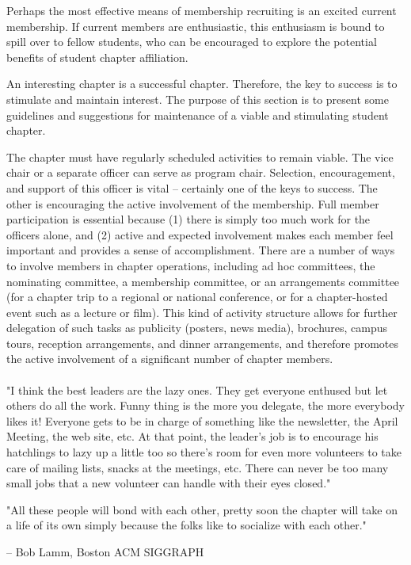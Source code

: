 Perhaps the most effective means of membership recruiting is an excited current
membership. If current members are enthusiastic, this enthusiasm is bound to
spill over to fellow students, who can be encouraged to explore the potential
benefits of student chapter affiliation.

An interesting chapter is a successful chapter. Therefore, the key to success is
to stimulate and maintain interest. The purpose of this section is to present
some guidelines and suggestions for maintenance of a viable and stimulating
student chapter.

The chapter must have regularly scheduled activities to remain viable. The vice
chair or a separate officer can serve as program chair. Selection, encouragement,
and support of this officer is vital -- certainly one of the keys to success.
The other is encouraging the active involvement of the membership. Full member
participation is essential because (1) there is simply too much work for the
officers alone, and (2) active and expected involvement makes each member feel
important and provides a sense of accomplishment. There are a number of ways to
involve members in chapter operations, including ad hoc committees, the
nominating committee, a membership committee, or an arrangements committee (for
a chapter trip to a regional or national conference, or for a chapter-hosted
event such as a lecture or film). This kind of activity structure allows for
further delegation of such tasks as publicity (posters, news media), brochures,
campus tours, reception arrangements, and dinner arrangements, and therefore
promotes the active involvement of a significant number of chapter members.
\\
\\
"I think the best leaders are the lazy ones. They get everyone enthused but let
others do all the work. Funny thing is the more you delegate, the more everybody
likes it! Everyone gets to be in charge of something like the newsletter, the
April Meeting, the web site, etc. At that point, the leader's job is to encourage
his hatchlings to lazy up a little too so there's room for even more volunteers
to take care of mailing lists, snacks at the meetings, etc. There can never be
too many small jobs that a new volunteer can handle with their eyes closed."

"All these people will bond with each other, pretty soon the chapter will take
on a life of its own simply because the folks like to socialize with each other."

-- Bob Lamm, Boston ACM SIGGRAPH

